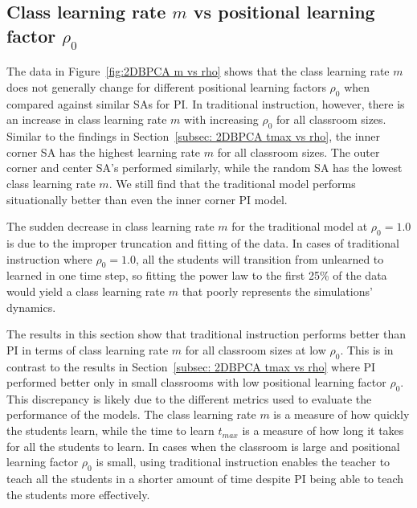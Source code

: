 \newpage

\subsection{Class learning rate $m$ vs positional learning factor $\rho_0$}

The data in Figure~\ref{fig:2DBPCA m vs rho} shows that the class learning rate $m$ does not generally change for different positional learning factors $\rho_0$ when compared against similar SAs for PI. 
In traditional instruction, however, there is an increase in class learning rate $m$ with increasing $\rho_0$ for all classroom sizes. 
Similar to the findings in Section~\ref{subsec: 2DBPCA tmax vs rho}, the inner corner SA has the highest learning rate $m$ for all classroom sizes. 
The outer corner and center SA's performed similarly, while the random SA has the lowest class learning rate $m$. We still find that the traditional model performs situationally better than even the inner corner PI model. 

The sudden decrease in class learning rate $m$ for the traditional model at $\rho_0 = 1.0$ is due to the improper truncation and fitting of the data. 
In cases of traditional instruction where $\rho_0 = 1.0$, all the students will transition from unlearned to learned in one time step, so fitting the power law to the first 25\% of the data would yield a class learning rate $m$ that poorly represents the simulations' dynamics.

The results in this section show that traditional instruction performs better than PI in terms of class learning rate $m$ for all classroom sizes at low $\rho_0$. 
This is in contrast to the results in Section~\ref{subsec: 2DBPCA tmax vs rho} where PI performed better only in small classrooms with low positional learning factor $\rho_0$. 
This discrepancy is likely due to the different metrics used to evaluate the performance of the models. The class learning rate $m$ is a measure of how quickly the students learn, while the time to learn $t_{max}$ is a measure of how long it takes for all the students to learn. 
In cases when the classroom is large and positional learning factor $\rho_0$ is small, using traditional instruction enables the teacher to teach all the students in a shorter amount of time despite PI being able to teach the students more effectively. 


